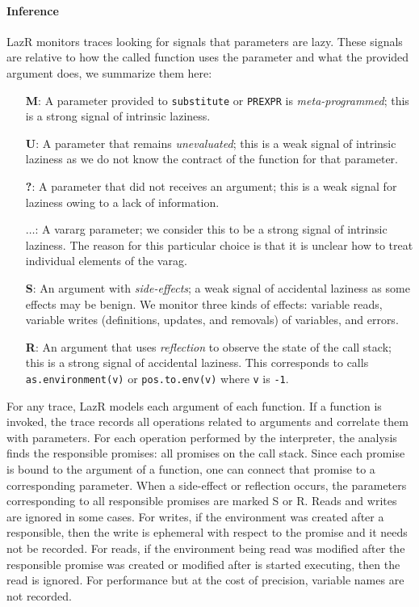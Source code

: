 \documentclass[review,creen,acmsmall]{acmart}
\renewcommand{\c}[1]{\lstinline |#1|\xspace}
\newcommand{\lazr}{{\sf LazR}\xspace}
\begin{document}
\paragraph{Inference}
\lazr monitors traces looking for signals that parameters are lazy. These
signals are relative to how the called function uses the parameter and what the
provided argument does, we summarize them here:
\begin{itemize}
\item[{\bf M}:] A parameter provided to \c{substitute} or \c{PREXPR} is
  \emph{meta-programmed}; this is a strong signal of intrinsic laziness.
\item[{\bf U}:] A parameter that remains \emph{unevaluated}; this is a weak
  signal of intrinsic laziness as we do not know the contract of the function
  for that parameter.
\item[{\bf ?}:] A parameter that did not receives an argument; this is a weak
  signal for laziness owing to a lack of information.
\item[$\dots$:] A vararg parameter; we consider this to be a strong
  signal of intrinsic laziness. The reason for this particular choice is that it
  is unclear how to treat individual elements of the varag.
\item [{\bf S}:] An argument with \emph{side-effects}; a weak signal of
  accidental laziness as some effects may be benign. We monitor three kinds of
  effects: variable reads, variable writes (definitions, updates, and removals)
  of variables, and errors.  %
\item[{\bf R}:] An argument that uses \emph{reflection} to observe the state of
  the call stack; this is a strong signal of accidental laziness. This
  corresponds to calls \c{as.environment(v)} or \c{pos.to.env(v)} where \c
  v is \c{-1}. %

\end{itemize}

For any trace, \lazr models each argument of each function. If a function is
invoked, the trace records all operations related to arguments and correlate
them with parameters. For each operation performed by the interpreter, the
analysis finds the responsible promises: all promises on the call stack. Since
each promise is bound to the argument of a function, one can connect that
promise to a corresponding parameter. When a side-effect or reflection occurs,
the parameters corresponding to all responsible promises are marked S or R.
Reads and writes are ignored in some cases. For writes, if the environment was
created after a responsible, then the write is ephemeral with respect to the
promise and it needs not be recorded. For reads, if the environment being read
was modified after the responsible promise was created or modified after is
started executing, then the read is ignored. For performance but at the cost of
precision, variable names are not recorded.
\end{document}
